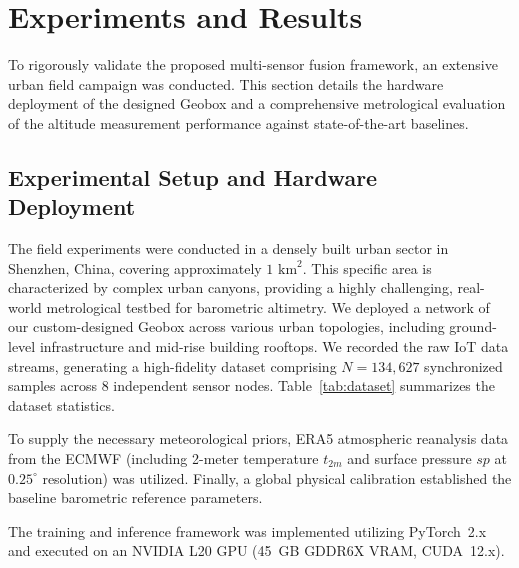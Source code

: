 
\section{Experiments and Results}
\label{sec:experiments}

To rigorously validate the proposed multi-sensor fusion framework, an extensive urban field campaign was conducted. This section details the hardware deployment of the designed Geobox and a comprehensive metrological evaluation of the altitude measurement performance against state-of-the-art baselines.

\subsection{Experimental Setup and Hardware Deployment}
\label{subsec:exp_setup}

The field experiments were conducted in a densely built urban sector in Shenzhen, China, covering approximately $1 \text{ km}^2$. This specific area is characterized by complex urban canyons, providing a highly challenging, real-world metrological testbed for barometric altimetry. We deployed a network of our custom-designed Geobox across various urban topologies, including ground-level infrastructure and mid-rise building rooftops. We recorded the raw IoT data streams, generating a high-fidelity dataset comprising $N = 134,627$ synchronized samples across 8 independent sensor nodes. Table~\ref{tab:dataset} summarizes the dataset statistics.

To supply the necessary meteorological priors, ERA5 atmospheric reanalysis data from the ECMWF (including 2-meter temperature $t_{2m}$ and surface pressure $sp$ at $0.25^\circ$ resolution) was utilized. Finally, a global physical calibration established the baseline barometric reference parameters.

The training and inference framework was implemented utilizing PyTorch~2.x and executed on an NVIDIA L20 GPU (45~GB GDDR6X VRAM, CUDA~12.x).

